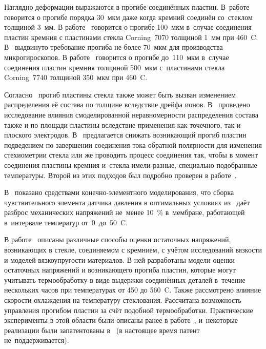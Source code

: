 Наглядно деформации выражаются в прогибе соединённых пластин.
В~работе~\cite{Rogers1992considerations} говорится о прогибе порядка 30~мкм
даже когда кремний соединён со~стеклом толщиной 3~мм.
В работе~\cite{rogers1995selection} говорится о прогибе 100~мкм в~случае
соединения пластин кремния с пластинами стекла Corning~7070 толщиной 1~мм
при 460~{\textdegree}C.
В~\cite{Rogers_current_limited_AB_2005} выдвинуто требование прогиба не
более 70~мкм для производства микрогироскопов.
В работе~\cite{LeeMC2005_gyro_siog} говорится о прогибе до~110~мкм
в~случае соединения пластин кремния толщиной 500~мкм с~пластинами стекла
Corning~7740 толщиной 350~мкм при 460~{\textdegree}C.

Согласно~\cite{Rogers1992considerations, rogers1995selection} прогиб
пластины стекла также может быть вызван изменением распределения её состава
по толщине вследствие дрейфа ионов.
В~\cite{Sadaba2006CompositionalGradients} проведено
исследование влияния смоделированной неравномерности распределения состава
также и по площади пластины вследствие применения как точечного, так
и плоского электродов.
В~\cite{Rogers1992considerations} предлагается снижать возникающий прогиб
пластин подведением по завершении соединения тока обратной полярности для
изменения стехиометрии стекла или же проводить процесс соединения так,
чтобы в момент соединения пластины кремния и~стекла имели разные,
специально подобранные температуры. Второй из этих подходов был подробно проверен в работе~\cite{Inzinga2012_infrared_characterization}.

В~\cite{maj2014influence_proceedings} показано средствами конечно-элементного моделирования, что сборка чувствительного элемента датчика давления в оптимальных условиях из~\cite{ettouhami1996thermal} даёт разброс механических напряжений не~менее 10~\% в~мембране, работающей в~интервале температур от~0~до~50~{\textdegree}C.

В работе~\cite{Kim2015warpage} описаны различные способы оценки остаточных напряжений,
возникающих в стекле, соединяемом с кремнием, с учётом исследований вязкости
и моделей вязкоупругости материалов.
В ней разработаны модели оценки остаточных напряжений и возникающего прогиба пластин, которые могут учитывать термообработку в виде выдержки соединённых деталей в~течение нескольких часов при температурах от 450 до 560~{\textdegree}C.
Также рассмотрено влияние скорости охлаждения на температуру стеклования. Рассчитана возможность управления прогибом пластин за счёт подобной термообработки. Практические эксперименты в этой области были описаны ранее в работе~\cite{Harz1996Curvature_changing}, и~некоторые реализации были запатентованы в~\cite{engelke1998process_bend_patent} (в настоящее время патент не~поддерживается).

